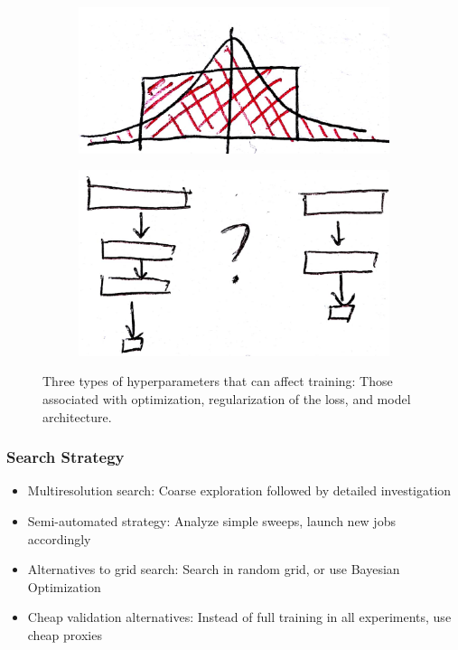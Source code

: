 \documentclass[10pt,mathserif]{beamer}
\begin{document}
\begin{frame}
\begin{figure}[ht]
\begin{subfigure}{.2\paperwidth}
    \end{subfigure}
    \begin{subfigure}{.2\paperwidth}
      \centering
      \includegraphics[width=0.17\paperwidth]{figure/weight_initialization}
    \end{subfigure}
    \begin{subfigure}{.2\paperwidth}
      \centering
      \includegraphics[width=0.17\paperwidth]{figure/architecture_choice}
    \end{subfigure}
    \caption{Three types of hyperparameters that can affect training: Those
      associated with optimization, regularization of the loss, and model
      architecture.
    \label{fig:hyperparameters} }
\end{figure}
\end{frame}

\begin{frame}
  \frametitle{Search Strategy}
  \begin{itemize}
  \item Multiresolution search: Coarse exploration followed by detailed
    investigation
  \item Semi-automated strategy: Analyze simple sweeps, launch new jobs
    accordingly
  \item Alternatives to grid search: Search in random grid, or use Bayesian
    Optimization
  \item Cheap validation alternatives: Instead of full training in all
    experiments, use cheap proxies
  \end{itemize}
\end{frame}
\end{document}
